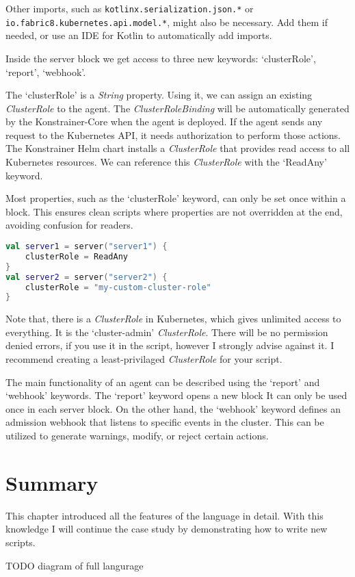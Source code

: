 Other imports, such as \lstinline|kotlinx.serialization.json.*| or \lstinline|io.fabric8.kubernetes.api.model.*|, might also be necessary. Add them if needed, or use an IDE for Kotlin to automatically add imports.

Inside the server block we get access to three new keywords: `clusterRole', `report', `webhook'.

The `clusterRole' is a \emph{String} property. Using it, we can assign an existing \emph{ClusterRole} to the agent. The \emph{ClusterRoleBinding} will be automatically generated by the Konstrainer-Core when the agent is deployed. If the agent sends any request to the Kubernetes API, it needs authorization to perform those actions. The Konstrainer Helm chart installs a \emph{ClusterRole} that provides read access to all Kubernetes resources. We can reference this \emph{ClusterRole} with the `ReadAny' keyword.

Most properties, such as the `clusterRole' keyword, can only be set once within a block. This ensures clean scripts where properties are not overridden at the end, avoiding confusion for readers.

\begin{lstlisting}[caption={Usage of the clusterRole keyword},language=Kotlin,label=code:clusterrole_usage]
val server1 = server("server1") {
    clusterRole = ReadAny
}
val server2 = server("server2") {
    clusterRole = "my-custom-cluster-role"
}
\end{lstlisting}

Note that, there is a \emph{ClusterRole} in Kubernetes, which gives unlimited access to everything. It is the `cluster-admin' \emph{ClusterRole}. There will be no permission denied errors, if you use it in the script, however I strongly advise against it. I recommend creating a least-privilaged \emph{ClusterRole} for your script.

The main functionality of an agent can be described using the `report' and `webhook' keywords. The `report' keyword opens a new block It can only be used once in each server block. On the other hand, the `webhook' keyword defines an admission webhook that listens to specific events in the cluster. This can be utilized to generate warnings, modify, or reject certain actions.





\section{Summary}

This chapter introduced all the features of the language in detail. With this knowledge I will continue the case study by demonstrating how to write new scripts.


TODO diagram of full langurage


